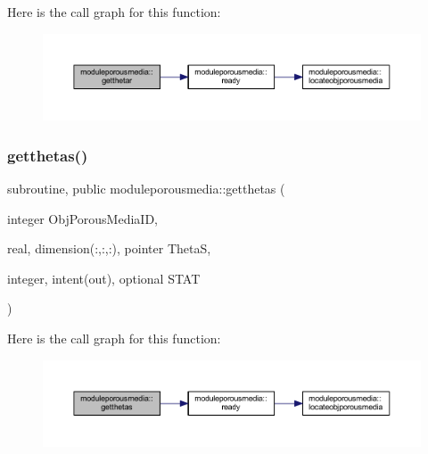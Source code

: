 Here is the call graph for this function\+:\nopagebreak
\begin{figure}[H]
\begin{center}
\leavevmode
\includegraphics[width=350pt]{namespacemoduleporousmedia_a40c5d4f62420edfa4bfd5f6ec20d6eda_cgraph}
\end{center}
\end{figure}
\mbox{\label{namespacemoduleporousmedia_a13998a8a43bd8d705b0fbcf88cee6f50}} 
\subsubsection{\texorpdfstring{getthetas()}{getthetas()}}
{\footnotesize\ttfamily subroutine, public moduleporousmedia\+::getthetas (\begin{DoxyParamCaption}\item[{integer}]{Obj\+Porous\+Media\+ID,  }\item[{real, dimension(\+:,\+:,\+:), pointer}]{ThetaS,  }\item[{integer, intent(out), optional}]{S\+T\+AT }\end{DoxyParamCaption})}

Here is the call graph for this function\+:\nopagebreak
\begin{figure}[H]
\begin{center}
\leavevmode
\includegraphics[width=350pt]{namespacemoduleporousmedia_a13998a8a43bd8d705b0fbcf88cee6f50_cgraph}
\end{center}
\end{figure}
\mbox{\label{namespacemoduleporousmedia_ad069d36e784e065b5145cf9e5a29e786}} 
